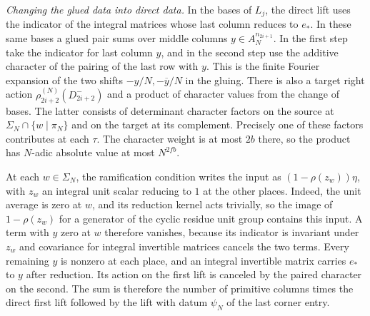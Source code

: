 \emph{Changing the glued data into direct data.}
In the bases of \(L_j\), the direct lift uses the indicator of the
integral matrices whose last column reduces to \(e_*\).
In these same bases a glued pair sums over middle columns
\(y\in A_N^{n_{2i+1}}\). In the first step take the indicator for
last column \(y\), and in the second step use the additive character
of the pairing of the last row with \(y\).
This is the finite Fourier expansion of the two shifts
\(-y/N,-\overline y/N\) in the gluing.
There is also a target right action \(\rho_{2i+2}^{(N)}(D_{2i+2}^-)\)
and a product of character values from the change of bases.
The latter consists of determinant character factors on the source at
\(\Sigma_N\cap\{w\mid\pi_N\}\) and on the target at its complement.
Precisely one of these factors contributes at each \(\tau\).
The character weight is at most \(2b\) there, so the product
has \(N\)-adic absolute value at most \(N^{2fb}\).

At each \(w\in\Sigma_N\), the ramification condition writes the input
as \((1-\rho(z_w))\eta\), with \(z_w\) an integral unit scalar
reducing to \(1\) at the other places. Indeed, the unit average is zero
at \(w\), and its reduction kernel acts trivially, so the image of
\(1-\rho(z_w)\) for a generator of the cyclic residue unit group
contains this input. A term with \(y\) zero at \(w\) therefore
vanishes, because its indicator is invariant under \(z_w\) and
covariance for integral invertible matrices cancels the two terms.
Every remaining \(y\) is nonzero at each place, and an integral
invertible matrix carries \(e_*\) to \(y\) after reduction.
Its action on the first lift is canceled by the paired character on the
second. The sum is therefore the number of primitive columns times
the direct first lift followed by the lift with datum \(\psi_N\)
of the last corner entry.

